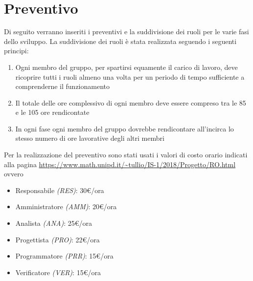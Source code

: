 	\section{Preventivo}
	Di seguito verranno inseriti i preventivi e la suddivisione dei ruoli per le varie fasi dello sviluppo. La suddivisione dei ruoli è stata realizzata seguendo i seguenti principi:
	\begin{enumerate}
		\item Ogni membro del gruppo, per spartirsi equamente il carico di lavoro, deve ricoprire tutti i ruoli almeno una volta per un periodo di tempo sufficiente a comprenderne il funzionamento
		\item Il totale delle ore complessivo di ogni membro deve essere compreso tra le 85 e le 105 ore rendicontate
		\item In ogni fase ogni membro del gruppo dovrebbe rendicontare all'incirca lo stesso numero di ore lavorative degli altri membri
	\end{enumerate} 

	Per la realizzazione del preventivo sono stati usati i valori di costo orario indicati alla pagina \url{https://www.math.unipd.it/~tullio/IS-1/2018/Progetto/RO.html} ovvero
	\begin{itemize}
		\item Responsabile \textit{(RES)}: 30\euro/ora
		\item Amministratore \textit{(AMM)}: 20\euro/ora
		\item Analista \textit{(ANA)}: 25\euro/ora
		\item Progettista \textit{(PRO)}: 22\euro/ora
		\item Programmatore \textit{(PRR)}: 15\euro/ora
		\item Verificatore \textit{(VER)}: 15\euro/ora
	\end{itemize}	
	
	
	
	
	
	
	
	
